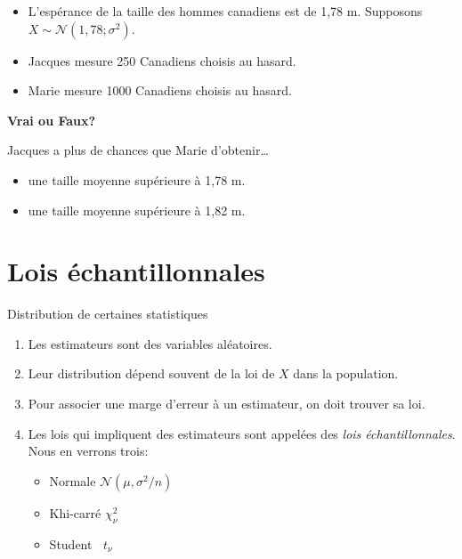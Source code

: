 \documentclass{BeamerTemplate}
\begin{document}
\begin{frame}[t]
\begin{itemize}
\item L'espérance de la taille des hommes canadiens est de 1,78 m. Supposons $X\sim\mathcal{N}(1,78; \sigma^2)$.
\item Jacques mesure 250 Canadiens choisis au hasard.
\item Marie mesure 1000 Canadiens choisis au hasard.
\end{itemize}
\bigskip

{\bf Vrai ou Faux?}
\medskip

Jacques a plus de chances que Marie d'obtenir\ldots
\begin{itemize}
\item  une taille moyenne supérieure à 1,78 m.
\item  une taille moyenne supérieure à 1,82 m.
\end{itemize}


\vspace{0.3cm}

\end{frame}

\section{Lois échantillonnales}

\begin{frame}[t]{Distribution de certaines statistiques}
\begin{enumerate}[$\bullet$]
\item Les estimateurs sont des variables aléatoires.
\item Leur distribution dépend souvent de la loi de $X$ dans la population.
\item Pour associer une marge d'erreur à un estimateur, on doit trouver sa loi.
\item Les lois qui impliquent des estimateurs sont appelées des {\it lois échantillonnales}. Nous en verrons trois:

    \begin{itemize}\itemsep1mm
\item Normale $\mathcal{N}(\mu, \sigma^2/n)$
\item Khi-carré $\chi^2_\nu$
\item Student $\;\;t_\nu$
\end{itemize}
\end{enumerate}

\end{frame}
\end{document}
